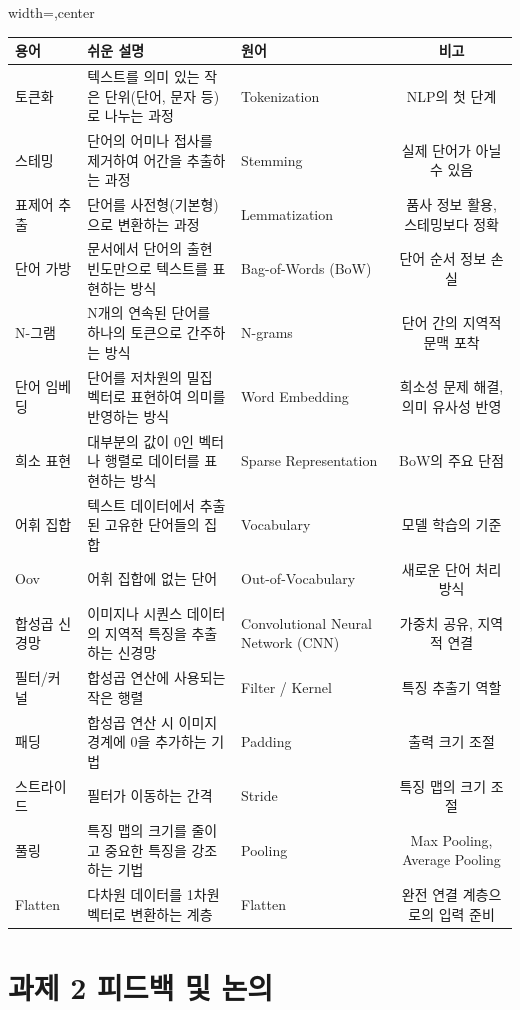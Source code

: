 \documentclass[11pt,a4paper]{article}
\theoremstyle{definition}
\begin{document}
\begin{adjustbox}{width=\textwidth,center}
\begin{tabular}{lllc}
\toprule
\textbf{용어} & \textbf{쉬운 설명} & \textbf{원어} & \textbf{비고} \\
\midrule
토큰화 & 텍스트를 의미 있는 작은 단위(단어, 문자 등)로 나누는 과정 & Tokenization & NLP의 첫 단계 \\
스테밍 & 단어의 어미나 접사를 제거하여 어간을 추출하는 과정 & Stemming & 실제 단어가 아닐 수 있음 \\
표제어 추출 & 단어를 사전형(기본형)으로 변환하는 과정 & Lemmatization & 품사 정보 활용, 스테밍보다 정확 \\
단어 가방 & 문서에서 단어의 출현 빈도만으로 텍스트를 표현하는 방식 & Bag-of-Words (BoW) & 단어 순서 정보 손실 \\
N-그램 & N개의 연속된 단어를 하나의 토큰으로 간주하는 방식 & N-grams & 단어 간의 지역적 문맥 포착 \\
단어 임베딩 & 단어를 저차원의 밀집 벡터로 표현하여 의미를 반영하는 방식 & Word Embedding & 희소성 문제 해결, 의미 유사성 반영 \\
희소 표현 & 대부분의 값이 0인 벡터나 행렬로 데이터를 표현하는 방식 & Sparse Representation & BoW의 주요 단점 \\
어휘 집합 & 텍스트 데이터에서 추출된 고유한 단어들의 집합 & Vocabulary & 모델 학습의 기준 \\
Oov & 어휘 집합에 없는 단어 & Out-of-Vocabulary & 새로운 단어 처리 방식 \\
합성곱 신경망 & 이미지나 시퀀스 데이터의 지역적 특징을 추출하는 신경망 & Convolutional Neural Network (CNN) & 가중치 공유, 지역적 연결 \\
필터/커널 & 합성곱 연산에 사용되는 작은 행렬 & Filter / Kernel & 특징 추출기 역할 \\
패딩 & 합성곱 연산 시 이미지 경계에 0을 추가하는 기법 & Padding & 출력 크기 조절 \\
스트라이드 & 필터가 이동하는 간격 & Stride & 특징 맵의 크기 조절 \\
풀링 & 특징 맵의 크기를 줄이고 중요한 특징을 강조하는 기법 & Pooling & Max Pooling, Average Pooling \\
Flatten & 다차원 데이터를 1차원 벡터로 변환하는 계층 & Flatten & 완전 연결 계층으로의 입력 준비 \\
\bottomrule
\end{tabular}
\end{adjustbox}

\newpage
\section{과제 2 피드백 및 논의}
\end{document}
